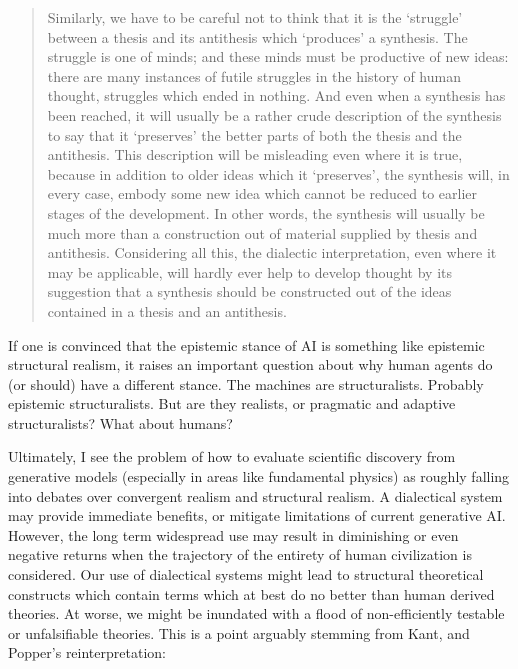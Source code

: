 \documentclass[11pt, oneside]{article}   	%
\begin{document}






\begin{quote}
    Similarly, we have to be careful not to think that it is the ‘struggle’ between a thesis and its antithesis which ‘produces’ a synthesis. The struggle is one of minds; and these minds must be productive of new ideas: there are many instances of futile struggles in the history of human thought, struggles which ended in nothing. And even when a synthesis has been reached, it will usually be a rather crude description of the synthesis to say that it ‘preserves’ the better parts of both the thesis and the antithesis. This description will be misleading even where it is true, because in addition to older ideas which it ‘preserves’, the synthesis will, in every case, embody some new idea which cannot be reduced to earlier stages of the development. In other words, the synthesis will usually be much more than a construction out of material supplied by thesis and antithesis. Considering all this, the dialectic interpretation, even where it may be applicable, will hardly ever help to develop thought by its suggestion that a synthesis should be constructed out of the ideas contained in a thesis and an antithesis. 
    \citep{PopperCR1963}
\end{quote}



If one is convinced that the epistemic stance of AI is something like epistemic structural realism, it raises an important question about why human agents do (or should) have a different stance.  The machines are structuralists.  Probably epistemic structuralists.  But are they realists, or pragmatic and adaptive structuralists?  What about humans?


Ultimately, I see the problem of how to evaluate  scientific discovery from generative models (especially in areas like fundamental physics) as roughly falling into debates over convergent realism and structural realism.  A dialectical system may provide immediate benefits, or mitigate limitations of current generative AI.  However, the long term widespread use may result in diminishing or even negative returns when the trajectory of the entirety of human civilization is considered.  Our use of dialectical systems might lead to structural theoretical constructs which contain terms which at best do no better than human derived theories.  At worse, we might be inundated with a flood of non-efficiently testable or unfalsifiable theories.  This is a point arguably stemming from Kant, and Popper's reinterpretation:
\end{document}
